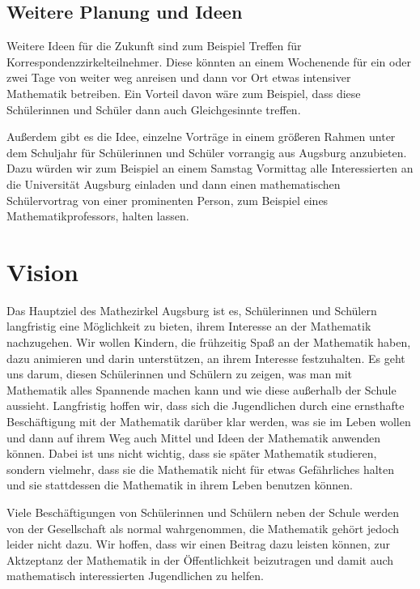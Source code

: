 \documentclass[12pt]{zettel}
\begin{document}
\subsection{Weitere Planung und Ideen}

Weitere Ideen für die Zukunft sind zum Beispiel Treffen für
Korrespondenzzirkelteilnehmer. Diese könnten an einem Wochenende für ein
oder zwei Tage von weiter weg anreisen und dann vor Ort etwas intensiver
Mathematik betreiben. Ein Vorteil davon wäre zum Beispiel, dass diese
Schülerinnen und Schüler dann auch Gleichgesinnte treffen.

Außerdem gibt es die Idee, einzelne Vorträge in einem größeren Rahmen
unter dem Schuljahr für Schülerinnen und Schüler vorrangig aus Augsburg
anzubieten. Dazu würden wir zum Beispiel an einem Samstag Vormittag alle
Interessierten an die Universität Augsburg einladen und dann einen
mathematischen Schülervortrag von einer prominenten Person, zum Beispiel
eines Mathematikprofessors, halten lassen.


\section{Vision}

Das Hauptziel des Mathezirkel Augsburg ist es, Schülerinnen und Schülern
langfristig eine Möglichkeit zu bieten, ihrem Interesse an der
Mathematik nachzugehen. Wir wollen Kindern, die frühzeitig Spaß an der
Mathematik haben, dazu animieren und darin unterstützen, an ihrem
Interesse festzuhalten. Es geht uns darum, diesen Schülerinnen und
Schülern zu zeigen, was man mit Mathematik alles Spannende machen kann
und wie diese außerhalb der Schule aussieht. Langfristig hoffen wir,
dass sich die Jugendlichen durch eine ernsthafte Beschäftigung mit der
Mathematik darüber klar werden, was sie im Leben wollen und dann auf
ihrem Weg auch Mittel und Ideen der Mathematik anwenden können. Dabei
ist uns nicht wichtig, dass sie später Mathematik studieren, sondern
vielmehr, dass sie die Mathematik nicht für etwas Gefährliches halten
und sie stattdessen die Mathematik in ihrem Leben benutzen können.

Viele Beschäftigungen von Schülerinnen und Schülern neben der Schule
werden von der Gesellschaft als normal wahrgenommen, die Mathematik
gehört jedoch leider nicht dazu. Wir hoffen, dass wir einen Beitrag dazu
leisten können, zur Aktzeptanz der Mathematik in der Öffentlichkeit
beizutragen und damit auch mathematisch interessierten Jugendlichen zu
helfen.
\end{document}
